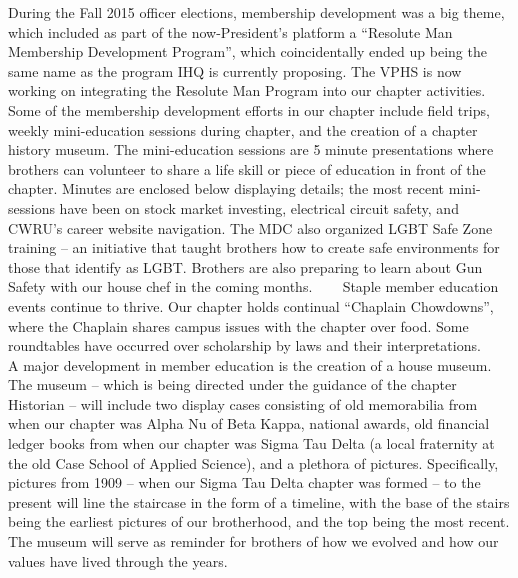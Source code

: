       During the Fall 2015 officer elections, membership development was a big theme, which included as part of the now-President's platform a ``Resolute Man Membership Development Program'', which coincidentally ended up being the same name as the program IHQ is currently proposing. The VPHS is now working on integrating the Resolute Man Program into our chapter activities.
    
      Some of the membership development efforts in our chapter include field trips, weekly mini-education sessions during chapter, and the creation of a chapter history museum. The mini-education sessions are 5 minute presentations where brothers can volunteer to share a life skill or piece of education in front of the chapter. Minutes are enclosed below displaying details; the most recent mini-sessions have been on stock market investing, electrical circuit safety, and CWRU's career website navigation. The MDC also organized LGBT Safe Zone training – an initiative that taught brothers how to create safe environments for those that identify as LGBT. Brothers are also preparing to learn about Gun Safety with our house chef in the coming months. 
    
      Staple member education events continue to thrive. Our chapter holds continual ``Chaplain Chowdowns'', where the Chaplain shares campus issues with the chapter over food. Some roundtables have occurred over scholarship by laws and their interpretations.
    
      A major development in member education is the creation of a house museum. The museum – which is being directed under the guidance of the chapter Historian – will include two display cases consisting of old memorabilia from when our chapter was Alpha Nu of Beta Kappa, national awards, old financial ledger books from when our chapter was Sigma Tau Delta (a local fraternity at the old Case School of Applied Science), and a plethora of pictures. Specifically, pictures from 1909 – when our Sigma Tau Delta chapter was formed – to the present will line the staircase in the form of a timeline, with the base of the stairs being the earliest pictures of our brotherhood, and the top being the most recent. The museum will serve as reminder for brothers of how we evolved and how our values have lived through the years. 